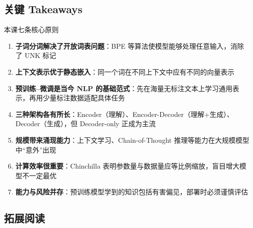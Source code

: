 \documentclass[a4paper]{article}
\begin{document}
\subsection{关键 Takeaways}

\begin{importantbox}{本课七条核心原则}
\begin{enumerate}
    \item \textbf{子词分词解决了开放词表问题}：BPE 等算法使模型能够处理任意输入，消除了 UNK 标记
    \item \textbf{上下文表示优于静态嵌入}：同一个词在不同上下文中应有不同的向量表示
    \item \textbf{预训练--微调是当今 NLP 的基础范式}：先在海量无标注文本上学习通用表示，再用少量标注数据适配具体任务
    \item \textbf{三种架构各有所长}：Encoder（理解）、Encoder-Decoder（理解+生成）、Decoder（生成），但 Decoder-only 正成为主流
    \item \textbf{规模带来涌现能力}：上下文学习、Chain-of-Thought 推理等能力在大规模模型中``意外''出现
    \item \textbf{计算效率很重要}：Chinchilla 表明参数量与数据量应等比例缩放，盲目增大模型不一定最优
    \item \textbf{能力与风险并存}：预训练模型学到的知识包括有害偏见，部署时必须谨慎评估
\end{enumerate}
\end{importantbox}

\subsection{拓展阅读}
\end{document}
